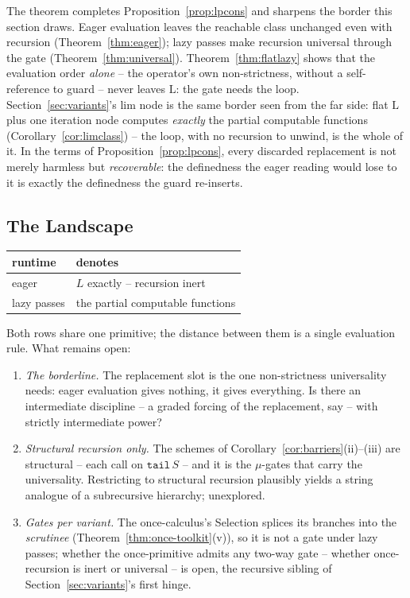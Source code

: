 \documentclass[runningheads,envcountsect]{llncs}
\begin{document}
The theorem completes Proposition~\ref{prop:lpcons} and sharpens the border this section draws. Eager evaluation leaves the reachable class unchanged even with recursion (Theorem~\ref{thm:eager}); lazy passes make recursion universal through the gate (Theorem~\ref{thm:universal}). Theorem~\ref{thm:flatlazy} shows that the evaluation order \emph{alone} -- the operator's own non-strictness, without a self-reference to guard -- never leaves $\mathrm{L}$: the gate needs the loop. Section~\ref{sec:variants}'s $\mathrm{lim}$ node is the same border seen from the far side: flat $\mathrm{L}$ plus one iteration node computes \emph{exactly} the partial computable functions (Corollary~\ref{cor:limclass}) -- the loop, with no recursion to unwind, is the whole of it. In the terms of Proposition~\ref{prop:lpcons}, every discarded replacement is not merely harmless but \emph{recoverable}: the definedness the eager reading would lose to it is exactly the definedness the guard re-inserts.

\subsection{The Landscape}

\begin{center}
\footnotesize
\begin{tabular}{l|l}
    runtime & denotes \\
    \hline
    eager & $L$ exactly -- recursion inert \\
    lazy passes & the partial computable functions
\end{tabular}
\end{center}

Both rows share one primitive; the distance between them is a single evaluation rule. What remains open:
\begin{enumerate}
    \item \emph{The borderline.} The replacement slot is the one non-strictness universality needs: eager evaluation gives nothing, it gives everything. Is there an intermediate discipline -- a graded forcing of the replacement, say -- with strictly intermediate power?
    \item \emph{Structural recursion only.} The schemes of Corollary~\ref{cor:barriers}(ii)--(iii) are structural -- each call on $\mathtt{tail}\,S$ -- and it is the $\mu$-gates that carry the universality. Restricting to structural recursion plausibly yields a string analogue of a subrecursive hierarchy; unexplored.
    \item \emph{Gates per variant.} The once-calculus's Selection splices its branches into the \emph{scrutinee} (Theorem~\ref{thm:once-toolkit}(v)), so it is not a gate under lazy passes; whether the once-primitive admits any two-way gate -- whether once-recursion is inert or universal -- is open, the recursive sibling of Section~\ref{sec:variants}'s first hinge.
\end{enumerate}
\end{document}
